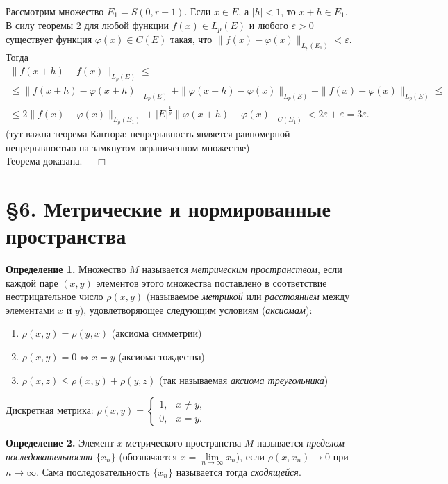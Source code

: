 \documentclass[12pt,a4paper, titlepage]{article}
\begin{document}
Рассмотрим множество $E_1 = \overline{S(0, r+1)}$. Если $x \in E$, а $|h| < 1$, то $x + h \in E_1$. В силу теоремы 2 для любой функции $f(x) \in L_p(E)$ и любого $\varepsilon > 0$ существует функция $\varphi (x) \in C(E)$ такая, что $\|f(x) - \varphi(x)\|_{L_p(E_1)} < \varepsilon$. Тогда
\begin{multline*}
\|f(x+h) - f(x)\|_{L_p(E)} \leqslant \\
\leqslant \|f(x+h)-\varphi(x+h)\|_{L_p(E)} + \|\varphi (x+h)-\varphi(x)\|_{L_p(E)} + \|f(x)-\varphi(x)\|_{L_p(E)} \leqslant \\
\leqslant 2\|f(x) - \varphi (x) \|_{L_p(E_1)} + |E|^\frac1p\|\varphi(x+h) - \varphi(x)\|_{C(E_1)} < 2 \varepsilon + \varepsilon = 3 \varepsilon.
\end{multline*}
(тут важна теорема Кантора: непрерывность является равномерной непрерывностью на замкнутом ограниченном множестве) \\
Теорема доказана. $\quad \Box$\\


\section*{ \S 6. Метрические и нормированные пространства}

\textbf{Определение 1.} Множество $M$ называется \textit{метрическим пространством}, если каждой паре $(x, y)$ элементов этого множества поставлено в соответствие неотрицательное число $\rho(x, y)$ (называемое \textit{метрикой} или \textit{расстоянием} между элементами $x$ и $y$), удовлетворяющее следующим условиям (\textit{аксиомам}):
\begin{enumerate}
\item 
$\rho(x, y) = \rho(y, x)$ (аксиома симметрии)
\item 
$\rho(x, y) = 0 \Leftrightarrow x = y$ (аксиома тождества)
\item
$\rho(x, z) \leqslant \rho(x, y) + \rho(y, z)$ (так называемая \textit{аксиома треугольника})
\end{enumerate}

Дискретная метрика: $\rho(x, y) = \begin{cases}
1, & x \neq y, \\
0, & x = y.
\end{cases}
$

\textbf{Определение 2.} Элемент $x$ метрического пространства $M$ называется \textit{пределом последовательности} $\lbrace x_n \rbrace$ (обозначается $x = \lim\limits_{n\to\infty} x_n$), если $\rho(x,x_n) \to 0$ при $n \to \infty$. Сама последовательность $\lbrace x_n \rbrace$ называется тогда \textit{сходящейся}. \\
\end{document}
